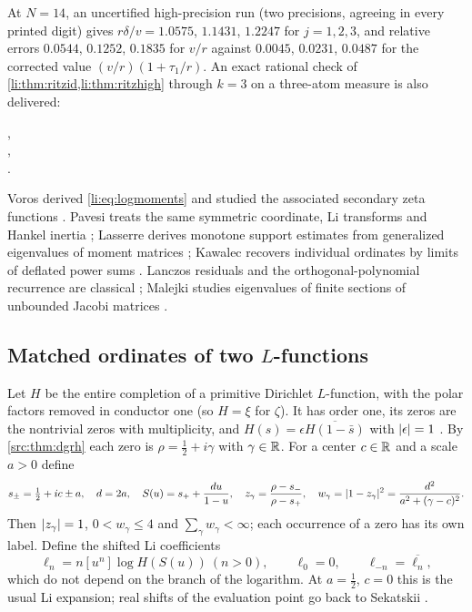 At $N=14$, an uncertified high-precision run (two precisions, agreeing in every printed digit) gives
$r\delta/v=1.0575$, $1.1431$, $1.2247$ for $j=1,2,3$, and relative errors $0.0544$, $0.1252$, $0.1835$
for $v/r$ against $0.0045$, $0.0231$, $0.0487$ for the corrected value $(v/r)(1+\tau_1/r)$. An exact
rational check of \cref{li:thm:ritzid,li:thm:ritzhigh} through $k=3$ on a three-atom measure is also
delivered:
\begin{center}
,\\
,\\
.
\end{center}

Voros derived \eqref{li:eq:logmoments} and studied the associated secondary zeta functions
\cite{Voros2006Sharpenings,Voros2003Zeta}. Pavesi treats the same symmetric coordinate, Li
transforms and Hankel inertia \cite{Pavesi2026Klein}; Lasserre derives monotone support estimates
from generalized eigenvalues of moment matrices \cite{Lasserre2011Bounding}; Kawalec recovers
individual ordinates by limits of deflated power sums \cite{Kawalec2022Analytical}. Lanczos residuals
and the orthogonal-polynomial recurrence are classical \cite{Zemke2003Krylov}; Malejki studies
eigenvalues of finite sections of unbounded Jacobi matrices \cite{Malejki2007Approximation}.

\subsection{Matched ordinates of two \texorpdfstring{$L$}{L}-functions}\label{li:sec:match}

Let $H$ be the entire completion of a primitive Dirichlet $L$-function, with the polar factors
removed in conductor one (so $H=\xi$ for $\zeta$). It has order one, its zeros are the nontrivial
zeros with multiplicity, and $H(s)=\epsilon\overline{H(1-\bar s)}$ with $\lvert\epsilon\rvert=1$
\cite{Lagarias2007Li}. By \cref{src:thm:dgrh} each zero is $\rho=\frac12+i\gamma$ with $\gamma\in\mathbb{R}$.
For a center $c\in\mathbb{R}$ and a scale $a>0$ define
\[
 s_\pm=\tfrac12+ic\pm a,\quad d=2a,\quad S(u)=s_++\frac{du}{1-u},\quad
 z_\gamma=\frac{\rho-s_-}{\rho-s_+},\quad w_\gamma=\lvert1-z_\gamma\rvert^2=\frac{d^2}{a^2+(\gamma-c)^2}.
\]
Then $\lvert z_\gamma\rvert=1$, $0<w_\gamma\le4$ and $\sum_\gamma w_\gamma<\infty$; each occurrence of a zero
has its own label. Define the shifted Li coefficients
\[
 \ell_n=n[u^n]\log H(S(u))\ (n>0),\qquad\ell_0=0,\qquad\ell_{-n}=\overline{\ell_n},
\]
which do not depend on the branch of the logarithm. At $a=\frac12$, $c=0$ this is the usual Li
expansion; real shifts of the evaluation point go back to Sekatskii \cite{Sekatskii2014Generalized}.

